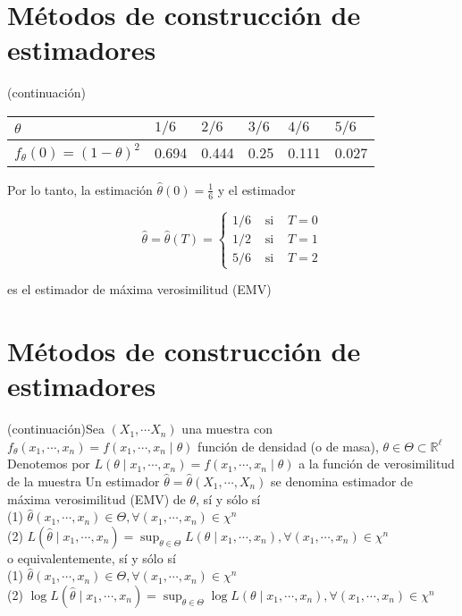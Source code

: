 \section*{Métodos de construcción de estimadores}
 (continuación)\begin{center}
  \begin{tabular}{|l|l|l|l|l|l|}
    \hline
    $\theta$                       & $1 / 6$ & $2 / 6$ & $3 / 6$ & $4 / 6$ & $5 / 6$ \\
    \hline
    $f_{\theta}(0)=(1-\theta)^{2}$ & 0.694   & 0.444   & 0.25    & 0.111   & 0.027   \\
    \hline
  \end{tabular}
\end{center}

Por lo tanto, la estimación $\hat{\theta}(0)=\frac{1}{6}$ y el estimador

$$
  \hat{\theta}=\hat{\theta}(T)=\left\{\begin{array}{lll}
    1 / 6 & \text { si } & T=0 \\
    1 / 2 & \text { si } & T=1 \\
    5 / 6 & \text { si } & T=2
  \end{array}\right.
$$

es el estimador de máxima verosimilitud (EMV)

\section*{Métodos de construcción de estimadores}
 (continuación)Sea $\left(X_{1}, \cdots X_{n}\right)$ una muestra con $f_{\theta}\left(x_{1}, \cdots, x_{n}\right)=f\left(x_{1}, \cdots, x_{n} \mid \theta\right)$ función de densidad (o de masa), $\theta \in \Theta \subset \mathbb{R}^{\ell}$ Denotemos por $L\left(\theta \mid x_{1}, \cdots, x_{n}\right)=f\left(x_{1}, \cdots, x_{n} \mid \theta\right)$ a la función de verosimilitud de la muestra Un estimador $\hat{\theta}=\hat{\theta}\left(X_{1}, \cdots, X_{n}\right)$ se denomina estimador de máxima verosimilitud (EMV) de $\theta$, sí y sólo sí\\
(1) $\hat{\theta}\left(x_{1}, \cdots, x_{n}\right) \in \Theta, \forall\left(x_{1}, \cdots, x_{n}\right) \in \chi^{n}$\\
(2) $L\left(\hat{\theta} \mid x_{1}, \cdots, x_{n}\right)=\sup _{\theta \in \Theta} L\left(\theta \mid x_{1}, \cdots, x_{n}\right), \forall\left(x_{1}, \cdots, x_{n}\right) \in \chi^{n}$\\
o equivalentemente, sí y sólo sí\\
(1) $\hat{\theta}\left(x_{1}, \cdots, x_{n}\right) \in \Theta, \forall\left(x_{1}, \cdots, x_{n}\right) \in \chi^{n}$\\
(2) $\log L\left(\hat{\theta} \mid x_{1}, \cdots, x_{n}\right)=\sup _{\theta \in \Theta} \log L\left(\theta \mid x_{1}, \cdots, x_{n}\right), \forall\left(x_{1}, \cdots, x_{n}\right) \in \chi^{n}$

